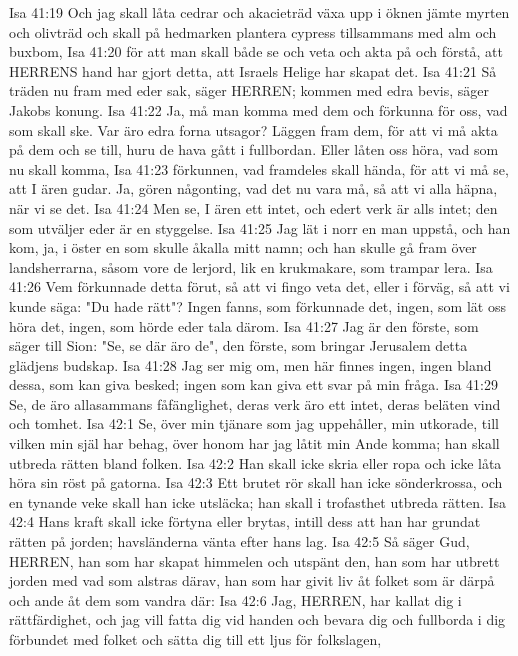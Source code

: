 Isa 41:19  Och jag skall låta cedrar och akacieträd växa upp i öknen jämte myrten och olivträd och skall på hedmarken plantera cypress tillsammans med alm och buxbom,
Isa 41:20  för att man skall både se och veta och akta på och förstå, att HERRENS hand har gjort detta, att Israels Helige har skapat det.
Isa 41:21  Så träden nu fram med eder sak, säger HERREN; kommen med edra bevis, säger Jakobs konung.
Isa 41:22  Ja, må man komma med dem och förkunna för oss, vad som skall ske. Var äro edra forna utsagor? Läggen fram dem, för att vi må akta på dem och se till, huru de hava gått i fullbordan. Eller låten oss höra, vad som nu skall komma,
Isa 41:23  förkunnen, vad framdeles skall hända, för att vi må se, att I ären gudar. Ja, gören någonting, vad det nu vara må, så att vi alla häpna, när vi se det.
Isa 41:24  Men se, I ären ett intet, och edert verk är alls intet; den som utväljer eder är en styggelse.
Isa 41:25  Jag lät i norr en man uppstå, och han kom, ja, i öster en som skulle åkalla mitt namn; och han skulle gå fram över landsherrarna, såsom vore de lerjord, lik en krukmakare, som trampar lera.
Isa 41:26  Vem förkunnade detta förut, så att vi fingo veta det, eller i förväg, så att vi kunde säga: "Du hade rätt"? Ingen fanns, som förkunnade det, ingen, som lät oss höra det, ingen, som hörde eder tala därom.
Isa 41:27  Jag är den förste, som säger till Sion: "Se, se där äro de", den förste, som bringar Jerusalem detta glädjens budskap.
Isa 41:28  Jag ser mig om, men här finnes ingen, ingen bland dessa, som kan giva besked; ingen som kan giva ett svar på min fråga.
Isa 41:29  Se, de äro allasammans fåfänglighet, deras verk äro ett intet, deras beläten vind och tomhet.
Isa 42:1  Se, över min tjänare som jag uppehåller, min utkorade, till vilken min själ har behag, över honom har jag låtit min Ande komma; han skall utbreda rätten bland folken.
Isa 42:2  Han skall icke skria eller ropa och icke låta höra sin röst på gatorna.
Isa 42:3  Ett brutet rör skall han icke sönderkrossa, och en tynande veke skall han icke utsläcka; han skall i trofasthet utbreda rätten.
Isa 42:4  Hans kraft skall icke förtyna eller brytas, intill dess att han har grundat rätten på jorden; havsländerna vänta efter hans lag.
Isa 42:5  Så säger Gud, HERREN, han som har skapat himmelen och utspänt den, han som har utbrett jorden med vad som alstras därav, han som har givit liv åt folket som är därpå och ande åt dem som vandra där:
Isa 42:6  Jag, HERREN, har kallat dig i rättfärdighet, och jag vill fatta dig vid handen och bevara dig och fullborda i dig förbundet med folket och sätta dig till ett ljus för folkslagen,
